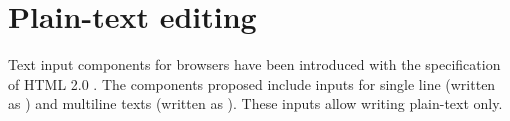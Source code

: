 \section{Plain-text editing}

Text input components for browsers have been introduced with the specification of HTML 2.0 \cite{RFC1866}. The components proposed include inputs for single line (written as ) and multiline texts (written as ). These inputs allow writing plain-text only.

